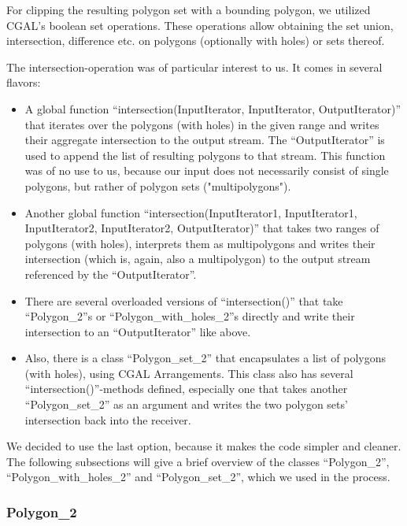 For clipping the resulting polygon set with a bounding polygon, we utilized CGAL's boolean set operations.
These operations allow obtaining the set union, intersection, difference etc. on polygons (optionally
with holes) or sets thereof.

The intersection-operation was of particular interest to us. It comes in several flavors:
\begin{itemize}
\item A global function ``intersection(InputIterator, InputIterator, OutputIterator)'' that iterates over the
  polygons (with holes) in the given range and writes their aggregate intersection to the output stream.
  The ``OutputIterator'' is used to append the list of resulting polygons to that stream.
  This function was of no use to us, because our input does not necessarily consist of single polygons,
  but rather of polygon sets ("multipolygons").
  
\item Another global function
  ``intersection(InputIterator1, InputIterator1, InputIterator2, InputIterator2, OutputIterator)'' that
  takes two ranges of polygons (with holes), interprets them as multipolygons and writes their intersection
  (which is, again, also a multipolygon) to the output stream referenced by the ``OutputIterator''.
  
\item There are several overloaded versions of ``intersection()'' that take ``Polygon\_2''s or ``Polygon\_with\_holes\_2''s
  directly and write their intersection to an ``OutputIterator'' like above.
  
\item Also, there is a class ``Polygon\_set\_2'' that encapsulates a list of polygons (with holes), using CGAL
  Arrangements. This class also has several ``intersection()''-methods defined, especially one that takes
  another ``Polygon\_set\_2'' as an argument and writes the two polygon sets' intersection back into the
  receiver.
\end{itemize}
  
We decided to use the last option, because it makes the code simpler and cleaner. The following subsections
will give a brief overview of the classes ``Polygon\_2'', ``Polygon\_with\_holes\_2'' and ``Polygon\_set\_2'', which
we used in the process.

\subsubsection{Polygon\_2}


